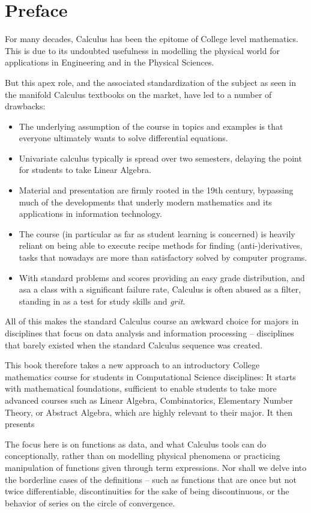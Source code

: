 \chapter{Preface}

For many decades, Calculus has been the epitome of College level mathematics.
This is due to its undoubted usefulness in modelling the physical world for
applications in Engineering and in the Physical Sciences.

But this apex role, and the associated standardization of the subject as seen
in the manifold Calculus textbooks on the market, have led to a number of
drawbacks:
\begin{itemize}
\item The underlying assumption of the course in topics and examples is
that everyone ultimately wants to solve differential equations.
\item Univariate calculus typically is spread over two semesters, delaying
the point for students to take Linear Algebra.
\item 
Material and presentation are firmly rooted in the 19th century, bypassing
much of the developments that underly modern mathematics and its applications
in information technology.
\item The course (in particular as far as student learning is concerned) is
heavily reliant on being able to execute recipe methods for finding
(anti-)derivatives, tasks that nowadays are more than satisfactory solved by
computer programs.
\item 
With standard problems and scores providing an easy grade distribution, and
asa a class with a significant failure rate, Calculus is often abused as a
filter, standing in as a test for study skills and {\em grit}.
\end{itemize}
All of this makes the standard Calculus course an awkward choice for majors
in disciplines that focus on data analysis and information processing --
disciplines that barely existed when the standard Calculus sequence was
created.

This book therefore takes a new approach to an introductory College
mathematics course for students in Computational Science disciplines: It
starts with mathematical foundations, sufficient to enable students to take
more advanced courses such as Linear Algebra, Combinatorics, Elementary
Number Theory, or Abstract Algebra, which are highly relevant to their major.
It then presents 

The focus here is on functions as data, and what Calculus tools can do
conceptionally, rather than on modelling physical phenomena or practicing
manipulation of functions given through term expressions. Nor shall we delve
into the borderline cases of the definitions -- such as functions that are
once but not twice differentiable, discontinuities for the sake of being
discontinuous, or the behavior of series on the circle of convergence.

